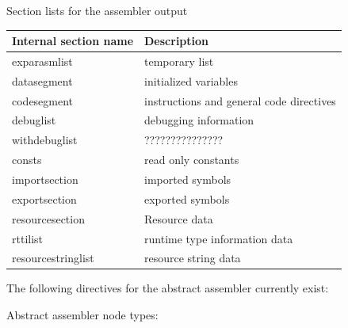 \documentclass [a4paper,12pt]{article}
\begin{document}
\begin{center}
Section lists for the assembler output
\end{center}

\begin{longtable}{|l|p{10cm}|}
\hline
Internal section name & Description \\
\hline
\endhead
\hline
\endfoot
exparasmlist    & temporary list \\
datasegment     & initialized variables \\
codesegment     & instructions and general code directives \\
debuglist       & debugging information \\
withdebuglist   & ??????????????? \\
consts          & read only constants \\
importsection   & imported symbols \\
exportsection   & exported symbols \\
resourcesection & Resource data \\
rttilist        & runtime type information data \\
resourcestringlist& resource string data
\end{longtable}

The following directives for the abstract assembler currently exist:

Abstract assembler node types:
\end{document}
